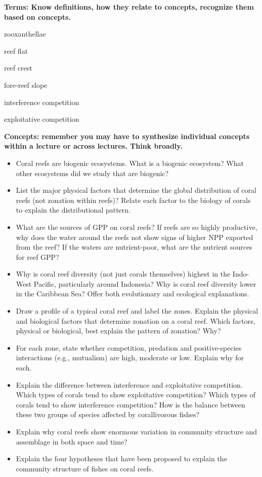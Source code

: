 \textbf{Terms: Know definitions, how they relate to concepts, recognize
them based on concepts.}

zooxanthellae

reef flat

reef crest

fore-reef slope

interference competition

exploitative competition

\textbf{Concepts: remember you may have to synthesize individual
concepts within a lecture or across lectures. Think broadly.}

\begin{itemize}
\item
  Coral reefs are biogenic ecosystems. What is a biogenic ecosystem?
  What other ecosystems did we study that are biogenic?
\item
  List the major physical factors that determine the global distribution
  of coral reefs (not zonation within reefs)? Relate each factor to the
  biology of corals to explain the distributional pattern.
\item
  What are the sources of GPP on coral reefs? If reefs are so highly
  productive, why does the water around the reefs not show signs of
  higher NPP exported from the reef? If the waters are nutrient-poor,
  what are the nutrient sources for reef GPP?
\item
  Why is coral reef diversity (not just corals themselves) highest in
  the Indo-West Pacific, particularly around Indonesia? Why is coral
  reef diversity lower in the Caribbean Sea? Offer both evolutionary and
  ecological explanations.
\item
  Draw a profile of a typical coral reef and label the zones. Explain
  the physical and biological factors that determine zonation on a coral
  reef. Which factors, physical or biological, best explain the pattern
  of zonation? Why?
\item
  For each zone, state whether competition, predation and
  positive-species interactions (e.g., mutualism) are high, moderate or
  low. Explain why for each.
\item
  Explain the difference between interference and exploitative
  competition. Which types of corals tend to show exploitative
  competition? Which types of corals tend to show interference
  competition? How is the balance between these two groups of species
  affected by corallivorous fishes?
\item
  Explain why coral reefs show enormous variation in community structure
  and assemblage in both space and time?
\item
  Explain the four hypotheses that have been proposed to explain the
  community structure of fishes on coral reefs.
\end{itemize}
